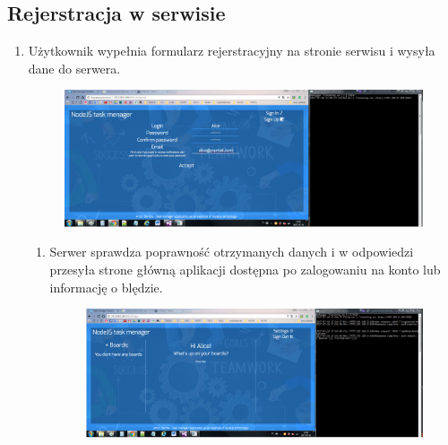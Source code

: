 \documentclass[12pt]{report}
\begin{document}
\subsection{Rejerstracja w serwisie}
\begin{enumerate}
\item Użytkownik wypełnia formularz rejerstracyjny na stronie serwisu i wysyła dane do serwera. 
\begin{figure}[!t]
\centering
\includegraphics{21.png}
\end{figure}
\begin{enumerate}
\item Serwer sprawdza poprawność otrzymanych danych i w odpowiedzi przesyła strone główną aplikacji dostępna po zalogowaniu na konto lub informację o blędzie.
\begin{figure}[!t]
\centering
\includegraphics{22.png}
\end{figure}
\end{enumerate}


\end{enumerate}
\end{document}
